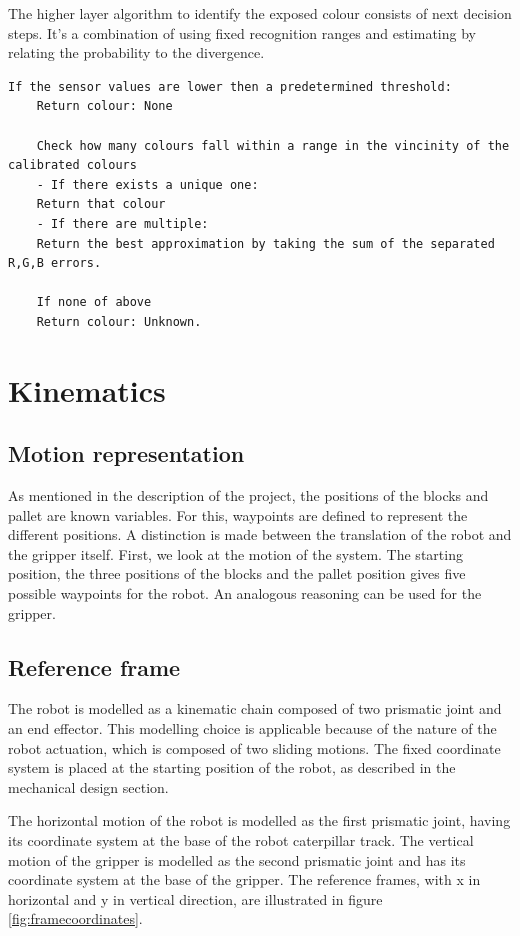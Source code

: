 \documentclass{article}
\begin{document}
	\par The higher layer algorithm to identify the exposed colour consists of next decision steps. It's a combination of using fixed recognition ranges and estimating by relating the probability to the divergence.
	\begin{Verbatim}[fontsize=\small]
	If the sensor values are lower then a predetermined threshold:
	Return colour: None
	
	Check how many colours fall within a range in the vincinity of the calibrated colours
	- If there exists a unique one:
	Return that colour
	- If there are multiple:
	Return the best approximation by taking the sum of the separated R,G,B errors.
	
	If none of above
	Return colour: Unknown.
	\end{Verbatim}
	
	\section{Kinematics}
	\subsection{Motion representation}
	
	As mentioned in the description of the project, the positions of the blocks and pallet are known variables. For this, waypoints are defined to represent the different positions. A distinction is made between the translation of the robot and the gripper itself. First, we look at the motion of the system. The starting position, the three positions of the blocks and the pallet position gives five possible waypoints for the robot. An analogous reasoning can be used for the gripper.
	
	\subsection{Reference frame}
	
	
	
	
	The robot is modelled as a kinematic chain composed of two prismatic joint and an end effector. This modelling choice is applicable because of the nature of the robot actuation, which is composed of two sliding motions. The fixed coordinate system is placed at the starting position of the robot, as described in the mechanical design section. 
	
	The horizontal motion of the robot is modelled as the first prismatic joint, having its coordinate system at the base of the robot caterpillar track. The vertical motion of the gripper is modelled as the second prismatic joint and has its coordinate system at the base of the gripper. The reference frames, with x in horizontal and y in vertical direction, are illustrated in figure \ref{fig:framecoordinates}.
	
\end{document}
